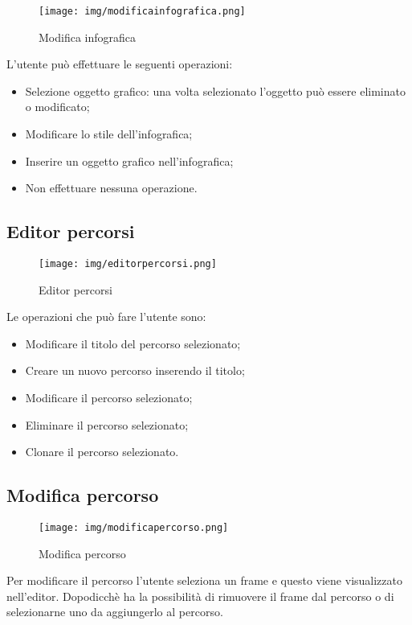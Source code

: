 \begin{figure}[h!]
		\centering
		\texttt{[image: img/modificainfografica.png]}
		\caption{Modifica infografica}
		\label{fig:ModelloSpy}
\end{figure}

L'utente può effettuare le seguenti operazioni:
\begin{itemize}
\item Selezione oggetto grafico: una volta selezionato l'oggetto può essere eliminato o modificato;
\item Modificare lo stile dell'infografica;
\item Inserire un oggetto grafico nell'infografica;
\item Non effettuare nessuna operazione.
\end{itemize}

\subsection{Editor percorsi}

\begin{figure}[h!]
		\centering
		\texttt{[image: img/editorpercorsi.png]}
		\caption{Editor percorsi}
		\label{fig:ModelloSpy}
\end{figure}

Le operazioni che può fare l'utente sono:
\begin{itemize}
\item Modificare il titolo del percorso selezionato;
\item Creare un nuovo percorso inserendo il titolo;
\item Modificare il percorso selezionato;
\item Eliminare il percorso selezionato; 
\item Clonare il percorso selezionato.
\end{itemize}

\subsection{Modifica percorso}

\begin{figure}[h!]
		\centering
		\texttt{[image: img/modificapercorso.png]}
		\caption{Modifica percorso}
		\label{fig:ModelloSpy}
\end{figure}

Per modificare il percorso l'utente seleziona un frame e questo viene visualizzato nell'editor. Dopodicchè ha la possibilità di rimuovere il frame dal percorso o di selezionarne uno da aggiungerlo al percorso.

